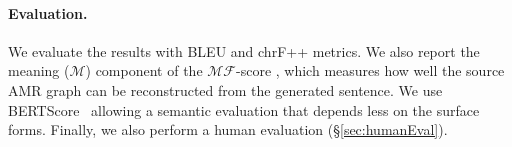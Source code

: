 \documentclass[11pt]{article}
\begin{document}
\paragraph{Evaluation.} We evaluate the results with BLEU \cite{papineni-etal-2002-bleu} and chrF++ \cite{popovic-2015-chrf} metrics. We also report the meaning ($\mathcal{M}$) component of the $\mathcal{MF}$-score \cite{opitz-frank-2021-towards}, which measures how well the source AMR graph can be reconstructed from the generated sentence. We use BERTScore~\cite{bert-score} allowing a semantic evaluation that depends less on the surface forms. Finally, we also perform a human evaluation (\S\ref{sec:humanEval}).

\begin{table}[t]
\centering
{}
\end{table}
\end{document}
